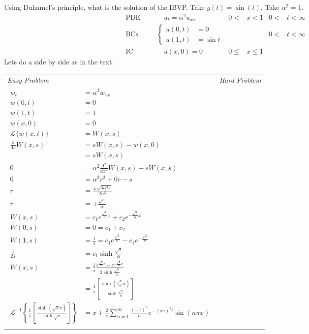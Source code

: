 \documentclass{article}
\begin{document}
Using Duhamel's principle, what is the solution of the IBVP. Take $g(t)=\sin(t)$. Take $\alpha^2=1$.
\begin{align*}
  \text{PDE}&&&\quad u_t=\alpha^2u_{xx}&0<&x<1&0<&t<\infty\\
  \text{BCs}&&&
  \begin{cases}
  u(0,t)&=0\\
  u(1,t)&=\sin t
  \end{cases}
  &&&0<&t<\infty\\
  \text{IC}&&&\quad u(x,0)=0&0\le&x\le1
\end{align*}
Lets do a side by side as in the text.

\begin{longtabu}{X|X}
  \emph{Easy Problem}
  &
  \emph{Hard Problem}\\
  {\begin{align*}
    w_t&=\alpha^2w_{xx}\\
    w(0,t)&=0\\
    w(1,t)&=1\\
    w(x,0)&=0\\
    \mathscr{L}\{w(x,t)\}&=W(x,s)\\
    \frac{\mathrm{d}}{\mathrm{d}s}W(x,s)&=sW(x,s)-w(x,0)\\
    &=sW(x,s)\\
    0&=\alpha^2\frac{\mathrm{d}^2}{\mathrm{d}x^2}W(x,s)-sW(x,s)\\
    0&=\alpha^2r^2+0r-s\\
    r&=\frac{\pm\sqrt{4\alpha^2s}}{2\alpha^2}\\
    r&=\pm\frac{\sqrt{s}}{\alpha}\\
    W(x,s)&=c_1e^{\frac{\sqrt{s}}{\alpha}x}+c_2e^{-\frac{\sqrt{s}}{\alpha}x}\\
    W(0,s)&=0=c_1+c_2\\
    W(1,s)&=\frac{1}{s}=c_1e^{\frac{\sqrt{s}}{\alpha}}-c_1e^{-\frac{\sqrt{s}}{\alpha}}\\
    \frac{1}{2s}&=c_1\sinh\frac{\sqrt{s}}{\alpha}\\
    W(x,s)&=\frac{1}{s}\frac{e^{\frac{\sqrt{s}}{\alpha}x}-e^{-\frac{\sqrt{s}}{\alpha}x}}{2\sinh\frac{\sqrt{s}}{\alpha}}\\
    &=\frac{1}{s}\left[\frac{\sinh\left(\frac{\sqrt{s}}{\alpha}x\right)}{\sinh\frac{\sqrt{s}}{\alpha}}\right]\\
    \mathscr{L}^{-1}\left\{\frac{1}{s}\left[\frac{\sinh\left(\sqrt{s}x\right)}{\sinh\sqrt{s}}\right]\right\}&=x+\frac{2}{\pi}\sum\limits_{n=1}^\infty{\frac{(-1)^n}{n}e^{-(n\pi)^2t}\sin(n\pi x)}\\

\end{align*}}
\end{longtabu}
\end{document}
